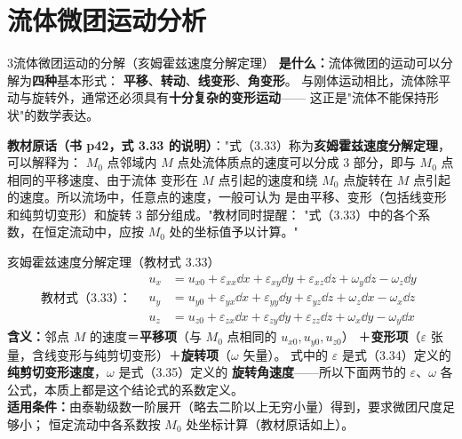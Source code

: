 \section{流体微团运动分析}

\begin{kaodian}{3}{流体微团运动的分解（亥姆霍兹速度分解定理）}
\textbf{是什么：}流体微团的运动可以分解为\textbf{四种}基本形式：
\textbf{平移}、\textbf{转动}、\textbf{线变形}、\textbf{角变形}。
与刚体运动相比，流体除平动与旋转外，通常还必须具有\textbf{十分复杂的变形运动}——
这正是"流体不能保持形状"的数学表达。

\textbf{教材原话（书 p42，式 3.33 的说明）}："式（3.33）称为\textbf{亥姆霍兹速度分解定理}，可以解释为：
$M_0$ 点邻域内 $M$ 点处流体质点的速度可以分成 3 部分，即与 $M_0$ 点相同的平移速度、由于流体
变形在 $M$ 点引起的速度和绕 $M_0$ 点旋转在 $M$ 点引起的速度。所以流场中，任意点的速度，一般可认为
是由平移、变形（包括线变形和纯剪切变形）和旋转 3 部分组成。"教材同时提醒：
"式（3.33）中的各个系数，在恒定流动中，应按 $M_0$ 处的坐标值予以计算。"

\begin{gongshi}{亥姆霍兹速度分解定理（教材式 3.33）}
\[ \text{教材式（3.33）：}\quad
\begin{aligned}
u_x&=u_{x0}+\varepsilon_{xx}\dd x+\varepsilon_{xy}\dd y+\varepsilon_{xz}\dd z+\omega_y\dd z-\omega_z\dd y\\
u_y&=u_{y0}+\varepsilon_{yx}\dd x+\varepsilon_{yy}\dd y+\varepsilon_{yz}\dd z+\omega_z\dd x-\omega_x\dd z\\
u_z&=u_{z0}+\varepsilon_{zx}\dd x+\varepsilon_{zy}\dd y+\varepsilon_{zz}\dd z+\omega_x\dd y-\omega_y\dd x
\end{aligned} \]
\textbf{含义：}邻点 $M$ 的速度＝\textbf{平移项}（与 $M_0$ 点相同的 $u_{x0},u_{y0},u_{z0}$）
＋\textbf{变形项}（$\varepsilon$ 张量，含线变形与纯剪切变形）＋\textbf{旋转项}（$\omega$ 矢量）。
式中的 $\varepsilon$ 是式（3.34）定义的\textbf{纯剪切变形速度}，$\omega$ 是式（3.35）定义的
\textbf{旋转角速度}——所以下面两节的 $\varepsilon$、$\omega$ 各公式，本质上都是这个结论式的系数定义。\\
\textbf{适用条件：}由泰勒级数一阶展开（略去二阶以上无穷小量）得到，要求微团尺度足够小；
恒定流动中各系数按 $M_0$ 处坐标计算（教材原话如上）。
\end{gongshi}


\end{kaodian}
